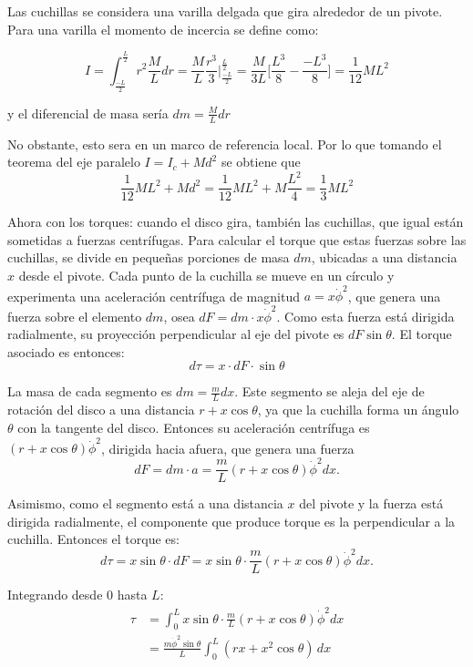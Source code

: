\documentclass[stu,12pt,floatsintext,draftfirst,spanish]{report}
\begin{document}
	Las cuchillas se considera una varilla delgada que gira alrededor de un pivote. Para una varilla el momento de incercia se define como:
	
	$$
	I= \int_{\frac{-L}{2}}^{\frac{L}{2}}r^{2} \frac{M}{L}dr= \frac{M}{L} \frac{r^{3}}{3} \Bigg|_{\frac{-L}{2}}^{\frac{L}{2}}=\frac{M}{3L}\bigg[ \frac{L^{3}}{8}- \frac{-L^{3}}{8}\bigg]=\frac{1}{12}ML^{2}
	$$
	
	y el diferencial de masa sería $dm=\frac{M}{L}dr$
	
	No obstante, esto sera en un marco de referencia local. Por lo que tomando el teorema del eje paralelo $I=I_{c}+Md^{2}$ se obtiene que 
	$$
	\frac{1}{12} ML^{2}+Md^{2}= \frac{1}{12}ML^{2}+M \frac{L^{2}}{4}= \frac{1}{3}ML^{2}
	$$
	
	Ahora con los torques: cuando el disco gira, también las cuchillas, que igual están sometidas a fuerzas centrífugas. Para calcular el torque que estas fuerzas sobre las cuchillas, se divide en pequeñas porciones de masa $dm$, ubicadas a una distancia $x$ desde el pivote. Cada punto de la cuchilla se mueve en un círculo y experimenta una aceleración centrífuga de magnitud $a = x \dot{\phi}^2$, que genera una fuerza sobre el elemento $dm$, osea $dF = dm \cdot x \dot{\phi}^2$. Como esta fuerza está dirigida radialmente, su proyección perpendicular al eje del pivote es $dF \sin\theta$. El torque asociado es entonces:
	\begin{equation} d\tau = x \cdot dF \cdot \sin\theta\end{equation}
	
	La masa de cada segmento es $dm = \frac{m}{L} dx$. Este segmento se aleja del eje de rotación del disco a una distancia $r + x\cos\theta$, ya que la cuchilla forma un ángulo $\theta$ con la tangente del disco. Entonces su aceleración centrífuga es $(r + x\cos\theta)\dot\phi^2$, dirigida hacia afuera, que genera una fuerza
	\begin{equation}
	dF = dm \cdot a = \frac{m}{L}(r + x\cos\theta)\dot\phi^2 dx.
	\end{equation}
	
	Asimismo, como el segmento está a una distancia $x$ del pivote y la fuerza está dirigida radialmente, el componente que produce torque es la perpendicular a la cuchilla. Entonces el torque es:
	\begin{equation}
	d\tau = x\sin\theta \cdot dF = x\sin\theta \cdot \frac{m}{L}(r + x\cos\theta)\dot\phi^2 dx.
	\end{equation}
	
	Integrando desde $0$ hasta $L$:
	\begin{equation}
		\begin{aligned}
	\tau &= \int_0^L x\sin\theta \cdot \frac{m}{L}(r + x\cos\theta)\dot\phi^2 dx\\
	&= \frac{m\dot\phi^2\sin\theta}{L} \int_0^L (rx + x^2\cos\theta)\,dx
	\end{aligned}
	\end{equation}
	
\end{document}
